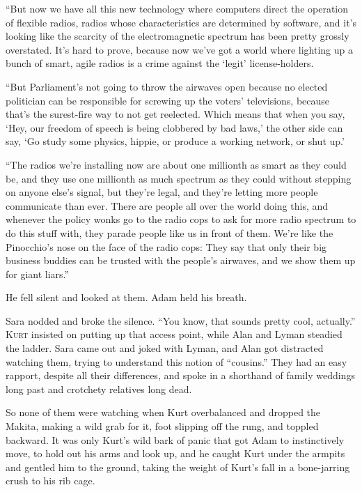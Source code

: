 \documentclass{article}
\begin{document}
``But now we have all this new technology where computers direct the
operation of flexible radios, radios whose characteristics are
determined by software, and it's looking like the scarcity of the
electromagnetic spectrum has been pretty grossly overstated.  It's
hard to prove, because now we've got a world where lighting up a bunch
of smart, agile radios is a crime against the `legit' license-holders.

``But Parliament's not going to throw the airwaves open because no
elected politician can be responsible for screwing up the voters'
televisions, because that's the surest-fire way to not get reelected. 
Which means that when you say, `Hey, our freedom of speech is being
clobbered by bad laws,' the other side can say, `Go study some
physics, hippie, or produce a working network, or shut up.'

``The radios we're installing now are about one millionth as smart as
they could be, and they use one millionth as much spectrum as they
could without stepping on anyone else's signal, but they're legal, and
they're letting more people communicate than ever.  There are people
all over the world doing this, and whenever the policy wonks go to the
radio cops to ask for more radio spectrum to do this stuff with, they
parade people like us in front of them.  We're like the Pinocchio's
nose on the face of the radio cops:  They say that only their big
business buddies can be trusted with the people's airwaves, and we
show them up for giant liars.''

He fell silent and looked at them.  Adam held his breath.

Sara nodded and broke the silence.  ``You know, that sounds pretty
cool, actually.''
\\
\lettrine[lines=3, lhang=.5, nindent=0pt, findent=2pt]{K}{urt} insisted on putting up that access point, while Alan and Lyman
steadied the ladder.  Sara came out and joked with Lyman, and Alan got
distracted watching them, trying to understand this notion of
``cousins.'' They had an easy rapport, despite all their differences,
and spoke in a shorthand of family weddings long past and crotchety
relatives long dead.

So none of them were watching when Kurt overbalanced and dropped the
Makita, making a wild grab for it, foot slipping off the rung, and
toppled backward.  It was only Kurt's wild bark of panic that got Adam
to instinctively move, to hold out his arms and look up, and he caught
Kurt under the armpits and gentled him to the ground, taking the
weight of Kurt's fall in a bone-jarring crush to his rib cage.
\end{document}
